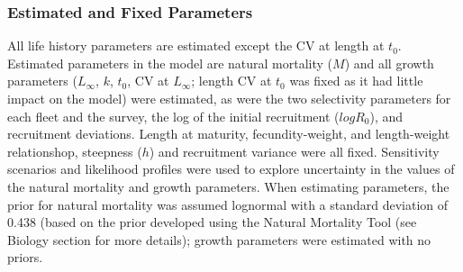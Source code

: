 \documentclass[11pt,
  english,
  a4paper,
]{article}
\begin{document}
\leavevmode\tagmcend\tagstructend\par


\hypertarget{estimated-and-fixed-parameters}{%
\subsubsection{Estimated and Fixed Parameters}\label{estimated-and-fixed-parameters}}

\leavevmode\tagmcend\tagstructend


All life history parameters are estimated except the CV at length at {\(t_0\)\leavevmode\tagmcend\tagstructend}. Estimated parameters in the model are natural mortality ({\(M\)\leavevmode\tagmcend\tagstructend}) and all growth parameters ({\(L_{\infty}\)\leavevmode\tagmcend\tagstructend}, {\(k\)\leavevmode\tagmcend\tagstructend}, {\(t_0\)\leavevmode\tagmcend\tagstructend}, CV at {\(L_{\infty}\)\leavevmode\tagmcend\tagstructend}; length CV at {\(t_0\)\leavevmode\tagmcend\tagstructend} was fixed as it had little impact on the model) were estimated, as were the two selectivity parameters for each fleet and the survey, the log of the initial recruitment ({\(logR_0\)\leavevmode\tagmcend\tagstructend}), and recruitment deviations. Length at maturity, fecundity-weight, and length-weight relationshop, steepness ({\(h\)\leavevmode\tagmcend\tagstructend}) and recruitment variance were all fixed. Sensitivity scenarios and likelihood profiles were used to explore uncertainty in the values of the natural mortality and growth parameters. When estimating parameters, the prior for natural mortality was assumed lognormal with a standard deviation of 0.438 (based on the prior developed using the Natural Mortality Tool (see Biology section for more details); growth parameters were estimated with no priors.

\leavevmode\tagmcend\tagstructend\par
\end{document}
